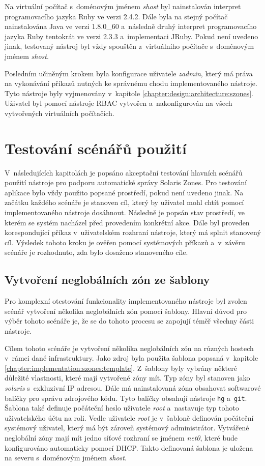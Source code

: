 Na virtuální počítač s~doménovým jménem \textit{shost} byl nainstalován interpret programovacího jazyka Ruby ve verzi 2.4.2.
Dále byla na stejný počítač nainstalována Java ve verzi 1.8.0\_60 a~následně druhý interpret programovacího jazyka Ruby
tentokrát ve verzi 2.3.3 a~implementaci JRuby. Pokud není uvedeno jinak, testovaný nástroj byl vždy spouštěn z~virtuálního
počítače s~doménovým jménem \textit{shost}.

Posledním učiněným krokem byla konfigurace uživatele \textit{zadmin}, který má práva na vykonávání příkazů nutných ke správnému
chodu implementovaného nástroje. Tyto nástroje byly vyjmenovány v~kapitole \ref{chapter:design:architecture:szones}. Uživatel 
byl pomocí nástroje RBAC vytvořen a~nakonfigurován na všech vytvořených virtuálních počítačích.
\section{Testování scénářů použití}
\label{chapter:testing:scenario}
V~následujících kapitolách je popsáno akceptační testování hlavních scénářů použití nástroje pro podporu automatické správy
Solaris Zones. Pro testování aplikace bylo vždy použito popsané prostředí, pokud není uvedeno jinak. Na začátku každého scénáře
je stanoven cíl, který by uživatel mohl chtít pomocí implementovaného nástroje dosáhnout. Následně je popsán stav prostředí, ve
kterém se systém nacházel před provedením konkrétní akce. Dále byl proveden korespondující příkaz v~uživatelském rozhraní nástroje,
který má splnit stanovený cíl. Výsledek tohoto kroku je ověřen pomocí systémových příkazů a~v~závěru scénáře je rozhodnuto, zda bylo
dosaženo stanoveného cíle.
\subsection{Vytvoření neglobálních zón ze šablony}
\label{chapter:testing:scenario:deploy_template}
Pro komplexní otestování funkcionality implementovaného nástroje byl zvolen scénář vytvoření několika neglobálních zón pomocí
šablony. Hlavní důvod pro výběr tohoto scénáře je, že se do tohoto procesu se zapojují téměř všechny části nástroje.

Cílem tohoto scénáře je vytvoření několika neglobálních zón na různých hostech v~rámci dané infrastruktury. Jako zdroj byla 
použita šablona popsaná v~kapitole \ref{chapter:implementation:szones:template}. Z~šablony byly vybrány některé důležité 
vlastnosti, které mají vytvořené zóny mít. Typ zóny byl stanoven jako \textit{solaris} s~exkluzivní IP adresou. Dále má 
nainstalovaná zóna obsahovat softwarové balíčky pro správu zdrojového kódu. Tyto balíčky obsahují nástroje \verb|hg|
a~\verb|git|. Šablona také definuje počáteční heslo uživatele \textit{root} a~nastavuje typ tohoto uživatelského účtu na roli.
Vedle uživatele \textit{root} je v~šabloně definován počáteční systémový uživatel, který má být zároveň systémový administrátor.
Vytvářené neglobální zóny mají mít jedno síťové rozhraní se jménem \textit{net0}, které bude konfigurováno automaticky pomocí
DHCP. Takto definovaná šablona je uložena na severu s~doménovým jménem \textit{shost}.

